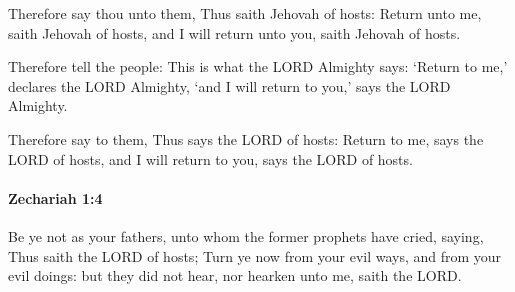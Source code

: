 			\begin{versebox}
					\item[BHS] 
					\item[LXX] 
					\item[ASV] Therefore say thou unto them, Thus saith Jehovah of hosts: Return unto me, saith Jehovah of hosts, and I will return unto you, saith Jehovah of hosts.
					\item[NIV] Therefore tell the people: This is what the LORD Almighty says: ‘Return to me,’ declares the LORD Almighty, ‘and I will return to you,’ says the LORD Almighty.
					\item[NRSV] Therefore say to them, Thus says the LORD of hosts: Return to me, says the LORD of hosts, and I will return to you, says the LORD of hosts.
			\end{versebox}

		\paragraph{Zechariah 1:4} %
			\label{ZECHARIAH-1-4}

			Be ye not as your fathers, unto whom the former prophets have cried, saying, Thus saith the LORD of hosts; Turn ye now from your evil ways, and from your evil doings: but they did not hear, nor hearken unto me, saith the LORD.

